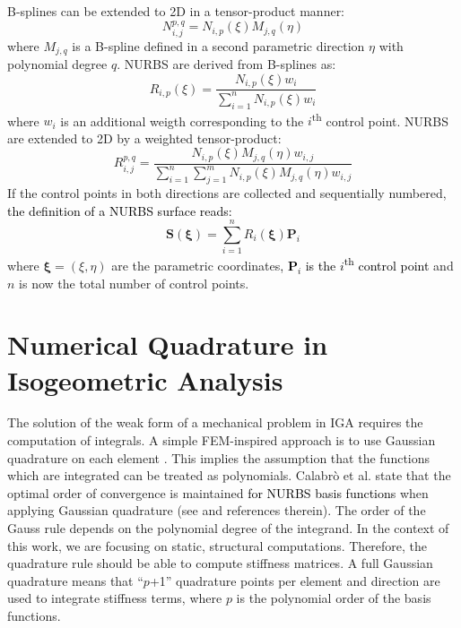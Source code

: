 \documentclass[3p]{elsarticle}
\newcommand{\reviewed}{\textcolor{black}}	%
\begin{document}
B-splines can be extended to 2D in a tensor-product manner:
\begin{equation}
	N_{i,j}^{p,q} = N_{i,p}(\xi)M_{j,q}(\eta)
\end{equation}
where $M_{j,q}$ is a B-spline defined in a second parametric direction $\eta$ with polynomial degree $q$. NURBS are derived from B-splines as:
\begin{equation}\label{equ:NURBS}
	R_{i,p}(\xi) = \dfrac{N_{i,p}(\xi)w_i}{\sum_{i=1}^n N_{i,p}(\xi)w_i}
\end{equation}
where $w_i$ is an additional weigth corresponding to the $i$\textsuperscript{th} control point. NURBS are extended to 2D by a weighted tensor-product:
\begin{equation}
	R_{i,j}^{p,q} = \dfrac{N_{i,p}(\xi)M_{j,q}(\eta)w_{i,j}}{\sum_{i=1}^{n}\sum_{j=1}^{m}N_{i,p}(\xi)M_{j,q}(\eta)w_{i,j}}
\end{equation}
If the control points in both directions are collected and sequentially numbered, \reviewed{the definition of a NURBS surface reads:}
\begin{equation}
	\mathbf{S}(\bm{\xi}) = \sum_{i=1}^n R_{i}(\bm{\xi}) \mathbf{P}_{i}
\end{equation}
where $\bm{\xi} = (\xi,\eta)$ are the parametric coordinates\reviewed{, $\mathbf{P}_i$ is the $i$\textsuperscript{th} control point} and $n$ is now the total number of control points.


\section{Numerical Quadrature in Isogeometric Analysis} \label{sec:numerical_quadrature}
The solution of the weak form of a mechanical problem in IGA requires the computation of integrals. A simple FEM-inspired approach is to use Gaussian quadrature on each element \cite{Hughes2005}. This implies the assumption that the functions which are integrated can be treated as polynomials. Calabr\`o et al. state that the optimal order of convergence is maintained \reviewed{for NURBS basis functions} when applying Gaussian quadrature (see \cite{Calabro2019} and references therein). The order of the Gauss rule depends on the polynomial degree of the integrand. In the context of this work, we are focusing on static, structural computations. Therefore, the quadrature rule should be able to compute stiffness matrices. A full Gaussian quadrature means that ``$p$+1'' quadrature points per element and direction are used to integrate stiffness terms, where $p$ is the polynomial order of the basis functions.
\end{document}

